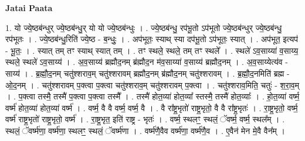 \documentclass[17pt]{extarticle}
\begin{document}
\textbf{Jatai Paata} \newline

1. यो ज्ये॒ष्ठब॑न्धुर् ज्ये॒ष्ठब॑न्धु॒र् यो यो ज्ये॒ष्ठब॑न्धुः । . ज्ये॒ष्ठब॑न्धु॒ रप॑भू॒तो ऽप॑भूतो ज्ये॒ष्ठब॑न्धुर् ज्ये॒ष्ठब॑न्धु॒ रप॑भूतः । . ज्ये॒ष्ठब॑न्धु॒रिति॑ ज्ये॒ष्ठ - ब॒न्धुः॒ । . अप॑भूतः॒ स्याथ् स्या दप॑भू॒तो ऽप॑भूतः॒ स्यात् । . अप॑भूत॒ इत्यप॑ - भू॒तः॒ । . स्यात् तम् तꣳ स्याथ् स्यात् तम् । . तꣳ स्थले॒ स्थले॒ तम् तꣳ स्थले᳚ । . स्थले॑ ऽव॒साय्या॑ व॒साय्य॒ स्थले॒ स्थले॑ ऽव॒साय्य॑ । . अ॒व॒साय्य॑ ब्रह्मौद॒नम् ब्र॑ह्मौद॒न म॑व॒साय्या॑ व॒साय्य॑ ब्रह्मौद॒नम् । . अ॒व॒साय्येत्य॑व - साय्य॑ । . ब्र॒ह्मौ॒द॒नम् चतु॑श्शराव॒म् चतु॑श्शरावम् ब्रह्मौद॒नम् ब्र॑ह्मौद॒नम् चतु॑श्शरावम् । . ब्र॒ह्मौ॒द॒नमिति॑ ब्रह्म - ओ॒द॒नम् । . चतु॑श्शरावम् प॒क्त्वा प॒क्त्वा चतु॑श्शराव॒म् चतु॑श्शरावम् प॒क्त्वा । . चतु॑श्शराव॒मिति॒ चतुः॑ - श॒रा॒व॒म् । . प॒क्त्वा तस्मै॒ तस्मै॑ प॒क्त्वा प॒क्त्वा तस्मै᳚ । . तस्मै॑ होत॒व्या॑ होत॒व्या᳚ स्तस्मै॒ तस्मै॑ होत॒व्याः᳚ । . हो॒त॒व्या॑ वर्ष्म॒ वर्ष्म॑ होत॒व्या॑ होत॒व्या॑ वर्ष्म॑ । . वर्ष्म॒ वै वै वर्ष्म॒ वर्ष्म॒ वै । . वै रा᳚ष्ट्र॒भृतो॑ राष्ट्र॒भृतो॒ वै वै रा᳚ष्ट्र॒भृतः॑ । . रा॒ष्ट्र॒भृतो॒ वर्ष्म॒ वर्ष्म॑ राष्ट्र॒भृतो॑ राष्ट्र॒भृतो॒ वर्ष्म॑ । . रा॒ष्ट्र॒भृत॒ इति॑ राष्ट्र - भृतः॑ । . वर्ष्म॒ स्थलꣳ॒॒ स्थलं॒ ॅवर्ष्म॒ वर्ष्म॒ स्थल᳚म् । . स्थलं॒ ॅवर्ष्म॑णा॒ वर्ष्म॑णा॒ स्थलꣳ॒॒ स्थलं॒ ॅवर्ष्म॑णा । . वर्ष्म॑णै॒वैव वर्ष्म॑णा॒ वर्ष्म॑णै॒व । . ए॒वैन॑ मेन मे॒वै वैन᳚म् । \newline
\end{document}
